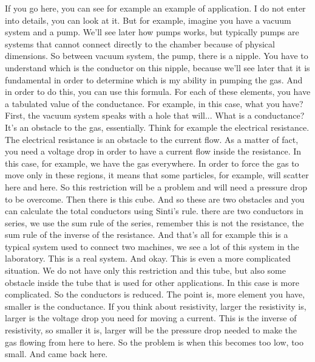If you go here, you can see for example an example of application. I do not enter into details, you can look at it. But for example, imagine you have a vacuum system and a pump. We'll see later how pumps works, but typically pumps are systems that cannot connect directly to the chamber because of physical dimensions. So between vacuum system, the pump, there is a nipple. You have to understand which is the conductor on this nipple, because we'll see later that it is fundamental in order to determine which is my ability in pumping the gas. And in order to do this, you can use this formula. For each of these elements, you have a tabulated value of the conductance. For example, in this case, what you have? First, the vacuum system speaks with a hole that will... What is a conductance? It's an obstacle to the gas, essentially. Think for example the electrical resistance. The electrical resistance is an obstacle to the current flow. As a matter of fact, you need a voltage drop in order to have a current flow inside the resistance. In this case, for example, we have the gas everywhere. In order to force the gas to move only in these regions, it means that some particles, for example, will scatter here and here. So this restriction will be a problem and will need a pressure drop to be overcome. Then there is this cube. And so these are two obstacles and you can calculate the total conductors using Sinti's rule. there are two conductors in series, we use the sum rule of the series, remember this is not the resistance, the sum rule of the inverse of the resistance.
And that's all for example this is a typical system used to connect two machines, we see a lot of this system in the laboratory. This is a real system. And okay.
This is even a more complicated situation. We do not have only this restriction and this tube, but also some obstacle inside the tube that is used for other applications. In this case is more complicated. So the conductors is reduced. The point is, more element you have, smaller is the conductance. If you think about resistivity, larger the resistivity is, larger is the voltage drop you need for moving a current. This is the inverse of resistivity, so smaller it is, larger will be the pressure drop needed to make the gas flowing from here to here. So the problem is when this becomes too low, too small. And came back here.
